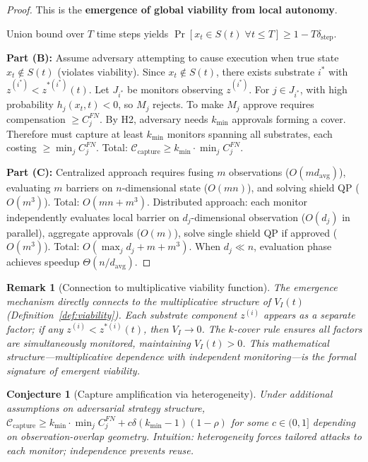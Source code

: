 \documentclass[11pt,a4paper]{article}
\newtheorem{remark}{Remark}
\newtheorem{conjecture}{Conjecture}
\begin{document}
\begin{proof}
This is the \textbf{emergence of global viability from local autonomy}.

Union bound over $T$ time steps yields $\Pr[x_t \in S(t) \;\forall t \leq T] \geq 1 - T\delta_{\text{step}}$.

\textbf{Part (B):} Assume adversary attempting to cause execution when true state $x_t \notin S(t)$ (violates viability). Since $x_t \notin S(t)$, there exists substrate $i^*$ with $z^{(i^*)} < z^{*(i^*)}(t)$. Let $J_{i^*}$ be monitors observing $z^{(i^*)}$. For $j \in J_{i^*}$, with high probability $h_j(x_t,t) < 0$, so $M_j$ rejects. To make $M_j$ approve requires compensation $\geq C_j^{FN}$. By H2, adversary needs $k_{\min}$ approvals forming a cover. Therefore must capture at least $k_{\min}$ monitors spanning all substrates, each costing $\geq \min_j C_j^{FN}$. Total: $\mathcal{C}_{\text{capture}} \geq k_{\min} \cdot \min_j C_j^{FN}$.

\textbf{Part (C):} Centralized approach requires fusing $m$ observations ($O(m d_{\text{avg}})$), evaluating $m$ barriers on $n$-dimensional state ($O(mn)$), and solving shield QP ($O(m^3)$). Total: $O(mn + m^3)$. Distributed approach: each monitor independently evaluates local barrier on $d_j$-dimensional observation ($O(d_j)$ in parallel), aggregate approvals ($O(m)$), solve single shield QP if approved ($O(m^3)$). Total: $O(\max_j d_j + m + m^3)$. When $d_j \ll n$, evaluation phase achieves speedup $\Theta(n/d_{\text{avg}})$.
\end{proof}

\begin{remark}[Connection to multiplicative viability function]
The emergence mechanism directly connects to the multiplicative structure of $V_I(t)$ (Definition~\ref{def:viability}). Each substrate component $z^{(i)}$ appears as a separate factor; if any $z^{(i)} < z^{*(i)}(t)$, then $V_I \to 0$. The $k$-cover rule ensures all factors are simultaneously monitored, maintaining $V_I(t) > 0$. This mathematical structure—multiplicative dependence with independent monitoring—is the formal signature of emergent viability.
\end{remark}

\begin{conjecture}[Capture amplification via heterogeneity]
Under additional assumptions on adversarial strategy structure, $\mathcal{C}_{\text{capture}} \geq k_{\min} \cdot \min_j C_j^{FN} + c\delta(k_{\min}-1)(1-\rho)$ for some $c \in (0,1]$ depending on observation-overlap geometry. Intuition: heterogeneity forces tailored attacks to each monitor; independence prevents reuse.
\end{conjecture}
\end{document}
